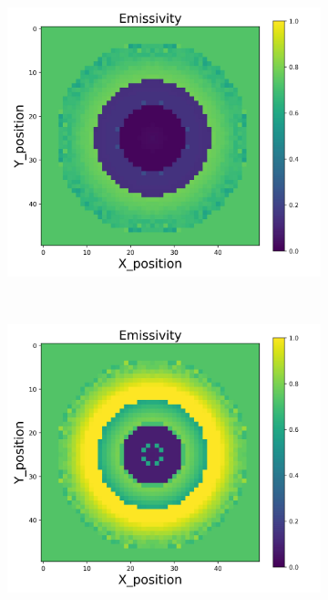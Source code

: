 {\begin{figure}[p]
\begin{minipage}{\textwidth}
\begin{subfigure}{0.325\textwidth}
        \end{subfigure}
        \begin{subfigure}{0.325\textwidth}
            \centering
            \includegraphics[width=\textwidth]{figures/raw_data/24/linear/emi_cal.jpg}
        \end{subfigure}
    \end{minipage}\\
    \begin{minipage}{\textwidth}
        \centering
        \begin{subfigure}{0.325\textwidth}
            \centering
            \includegraphics[width=\textwidth]{figures/raw_data/25/linear/emi_cal.jpg}

\end{subfigure}
\end{minipage}
\end{figure}}
